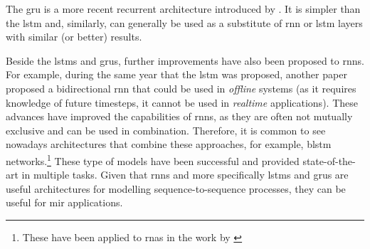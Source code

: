

The \gls{gru} is a more recent recurrent architecture
introduced by \textcite{cho2014learning}. It is simpler than
the \gls{lstm} and, similarly, can generally be used as a
substitute of \gls{rnn} or \gls{lstm} layers with similar
(or better) results.

Beside the \glspl{lstm} and \glspl{gru}, further
improvements have also been proposed to \glspl{rnn}. For
example, during the same year that the \gls{lstm} was
proposed, another paper proposed a bidirectional \gls{rnn}
that could be used in \emph{offline} systems (as it requires
knowledge of future timesteps, it cannot be used in
\emph{realtime} applications). These advances have improved
the capabilities of \glspl{rnn}, as they are often not
mutually exclusive and can be used in combination.
Therefore, it is common to see nowadays architectures that
combine these approaches, for example, \gls{blstm}
networks.\footnote{These have been applied to \glspl{rna} in
the work by \textcite{chen2018functional}} These type of
models have been successful and provided state-of-the-art in
multiple tasks. Given that \glspl{rnn} and more specifically
\glspl{lstm} and \glspl{gru} are useful architectures for
modelling sequence-to-sequence processes, they can be useful
for \gls{mir} applications.
